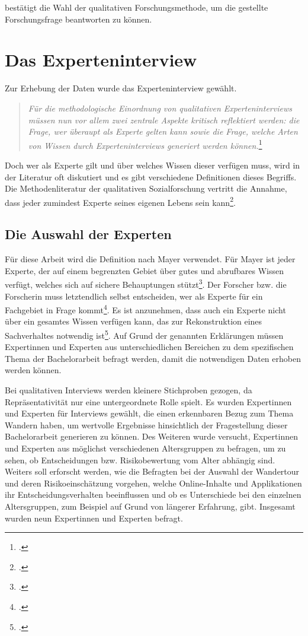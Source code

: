 bestätigt die Wahl der qualitativen Forschungsmethode, um die gestellte Forschungsfrage beantworten zu können.



\section{Das Experteninterview}

Zur Erhebung der Daten wurde das Experteninterview gewählt. 

\begin{quote}
	\textit{\glqq Für die methodologische Einordnung von qualitativen Experteninterviews müssen nun vor allem zwei zentrale Aspekte kritisch reflektiert werden: die Frage, wer überaupt als Experte gelten kann sowie die Frage, welche Arten von Wissen durch Experteninterviews generiert werden können.\grqq}\footcite[S. 35]{kaiser}
\end{quote}

Doch wer als Experte gilt und über welches Wissen dieser verfügen muss, wird in der Literatur oft diskutiert und es gibt verschiedene Definitionen dieses Begriffs.
Die Methodenliteratur der qualitativen Sozialforschung vertritt die Annahme, dass jeder zumindest Experte seines eigenen Lebens sein kann\footcite[S. 116]{przyborski}.

\subsection{Die Auswahl der Experten}

Für diese Arbeit wird die Definition nach Mayer verwendet. Für Mayer ist jeder Experte, der auf einem begrenzten Gebiet über gutes und abrufbares Wissen verfügt, welches sich auf sichere Behauptungen stützt\footcite[S. 41]{mayer}.
Der Forscher bzw. die Forscherin muss letztendlich selbst entscheiden, wer als Experte für ein Fachgebiet in Frage kommt\footcite[S. 39]{kaiser}. Es ist anzunehmen, dass auch ein Experte nicht über ein gesamtes Wissen verfügen kann, das zur Rekonstruktion eines Sachverhaltes notwendig ist\footcite[S. 113]{glaeser}. Auf Grund der genannten Erklärungen müssen Expertinnen und Experten aus unterschiedlichen Bereichen zu dem spezifischen Thema der Bachelorarbeit befragt werden, damit die notwendigen Daten erhoben werden können.

Bei qualitativen Interviews werden kleinere Stichproben gezogen, da Repräsentativität nur eine untergeordnete Rolle spielt. Es wurden Expertinnen und Experten für Interviews gewählt, die einen erkennbaren Bezug zum Thema Wandern haben, um wertvolle Ergebnisse hinsichtlich der Fragestellung dieser Bachelorarbeit generieren zu können. Des Weiteren wurde versucht, Expertinnen und Experten aus möglichst verschiedenen Altersgruppen zu befragen, um zu sehen, ob Entscheidungen bzw. Risikobewertung vom Alter abhängig sind.  Weiters soll erforscht werden, wie die Befragten bei der Auswahl der Wandertour und deren Risikoeinschätzung vorgehen, welche Online-Inhalte und Applikationen ihr Entscheidungsverhalten beeinflussen und ob es Unterschiede bei den einzelnen Altersgruppen, zum Beispiel auf Grund von längerer Erfahrung, gibt. Insgesamt wurden neun Expertinnen und Experten befragt.


